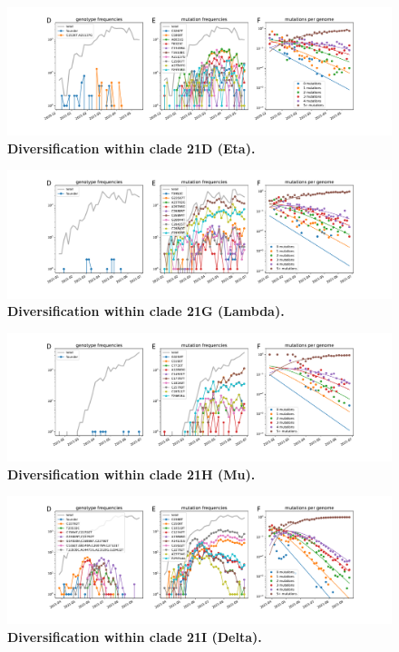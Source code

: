 \begin{figure}[h]
    \includegraphics[width=\textwidth]{figures/counts/21D_counts.pdf}
    \caption{{\bf Diversification within clade 21D (Eta).}
    \label{fig:21D_counts}}
\end{figure}


\begin{figure}[h]
    \includegraphics[width=\textwidth]{figures/counts/21G_counts.pdf}
    \caption{{\bf Diversification within clade 21G (Lambda).}
    \label{fig:21G_counts}}
\end{figure}


\begin{figure}[h]
    \includegraphics[width=\textwidth]{figures/counts/21H_counts.pdf}
    \caption{{\bf Diversification within clade 21H (Mu).}
    \label{fig:21H_counts}}
\end{figure}



\begin{figure}[h]
    \includegraphics[width=\textwidth]{figures/counts/21I_counts.pdf}
    \caption{{\bf Diversification within clade 21I (Delta).}
    \label{fig:21I_counts}}
\end{figure}


